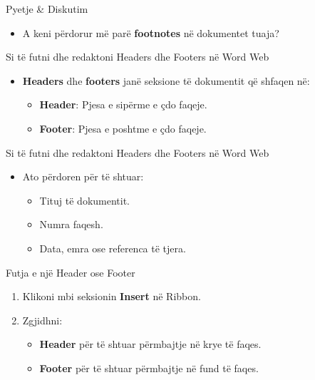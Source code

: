 \documentclass[
  ignorenonframetext,
]{beamer}
\providecommand{\tightlist}{%
  \setlength{\itemsep}{0pt}\setlength{\parskip}{0pt}}
\begin{document}
\begin{frame}{Pyetje \& Diskutim}
\label{pyetje-diskutim-2}
\begin{itemize}
\tightlist
\item
  A keni përdorur më parë \textbf{footnotes} në dokumentet tuaja?
\end{itemize}
\end{frame}

\begin{frame}{Si të futni dhe redaktoni Headers dhe Footers në Word Web}
\label{si-tuxeb-futni-dhe-redaktoni-headers-dhe-footers-nuxeb-word-web}
\begin{itemize}
\item
  \textbf{Headers} dhe \textbf{footers} janë seksione të dokumentit që
  shfaqen në:

  \begin{itemize}
  \item
    \textbf{Header}: Pjesa e sipërme e çdo faqeje.
  \item
    \textbf{Footer}: Pjesa e poshtme e çdo faqeje.
  \end{itemize}
\end{itemize}
\end{frame}

\begin{frame}{Si të futni dhe redaktoni Headers dhe Footers në Word Web}
\label{si-tuxeb-futni-dhe-redaktoni-headers-dhe-footers-nuxeb-word-web-1}
\begin{itemize}
\item
  Ato përdoren për të shtuar:

  \begin{itemize}
  \item
    Tituj të dokumentit.
  \item
    Numra faqesh.
  \item
    Data, emra ose referenca të tjera.
  \end{itemize}
\end{itemize}
\end{frame}

\begin{frame}{Futja e një Header ose Footer}
\label{futja-e-njuxeb-header-ose-footer}
\begin{enumerate}
\item
  Klikoni mbi seksionin \textbf{Insert} në Ribbon.
\item
  Zgjidhni:

  \begin{itemize}
  \item
    \textbf{Header} për të shtuar përmbajtje në krye të faqes.
  \item
    \textbf{Footer} për të shtuar përmbajtje në fund të faqes.
  \end{itemize}
\end{enumerate}
\end{frame}
\end{document}
